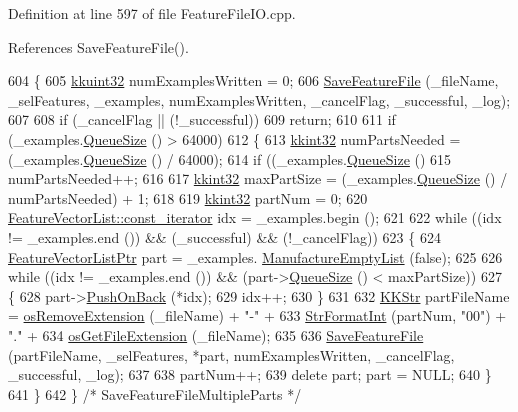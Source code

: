 Definition at line 597 of file Feature\+File\+I\+O.\+cpp.



References Save\+Feature\+File().


\begin{DoxyCode}
604 \{
605   \hyperlink{namespace_k_k_b_af8d832f05c54994a1cce25bd5743e19a}{kkuint32}  numExamplesWritten = 0;
606   \hyperlink{class_k_k_m_l_l_1_1_feature_file_i_o_ab4ad6c5a641f1f8f7c72c1be98bc1da8}{SaveFeatureFile} (\_fileName, \_selFeatures, \_examples, numExamplesWritten, \_cancelFlag, 
      \_successful, \_log);
607 
608   \textcolor{keywordflow}{if}  (\_cancelFlag  ||  (!\_successful))
609     \textcolor{keywordflow}{return};
610 
611   \textcolor{keywordflow}{if}  (\_examples.\hyperlink{class_k_k_b_1_1_k_k_queue_a1dab601f75ee6a65d97f02bddf71c40d}{QueueSize} () > 64000)
612   \{
613     \hyperlink{namespace_k_k_b_a8fa4952cc84fda1de4bec1fbdd8d5b1b}{kkint32}  numPartsNeeded = (\_examples.\hyperlink{class_k_k_b_1_1_k_k_queue_a1dab601f75ee6a65d97f02bddf71c40d}{QueueSize} () / 64000);
614     \textcolor{keywordflow}{if}  ((\_examples.\hyperlink{class_k_k_b_1_1_k_k_queue_a1dab601f75ee6a65d97f02bddf71c40d}{QueueSize} () %
615       numPartsNeeded++;
616 
617     \hyperlink{namespace_k_k_b_a8fa4952cc84fda1de4bec1fbdd8d5b1b}{kkint32}  maxPartSize = (\_examples.\hyperlink{class_k_k_b_1_1_k_k_queue_a1dab601f75ee6a65d97f02bddf71c40d}{QueueSize} () / numPartsNeeded) + 1;
618 
619     \hyperlink{namespace_k_k_b_a8fa4952cc84fda1de4bec1fbdd8d5b1b}{kkint32}  partNum = 0;
620     \hyperlink{class_k_k_b_1_1_k_k_queue_aeb057c9c010446f46f57c1e355f981f1}{FeatureVectorList::const\_iterator} idx = \_examples.begin ();
621 
622     \textcolor{keywordflow}{while}  ((idx != \_examples.end ())  &&  (\_successful)  &&  (!\_cancelFlag))
623     \{
624       \hyperlink{class_k_k_m_l_l_1_1_feature_vector_list}{FeatureVectorListPtr}  part = \_examples.
      \hyperlink{class_k_k_m_l_l_1_1_feature_vector_list_af533da1b34e4123f4fcb1343d5f48e37}{ManufactureEmptyList} (\textcolor{keyword}{false});
625 
626       \textcolor{keywordflow}{while}  ((idx != \_examples.end ())  &&  (part->\hyperlink{class_k_k_b_1_1_k_k_queue_a1dab601f75ee6a65d97f02bddf71c40d}{QueueSize} () < maxPartSize))
627       \{
628         part->\hyperlink{class_k_k_m_l_l_1_1_feature_vector_list_abd43779a90a6aa3db1de8092be877bdb}{PushOnBack} (*idx);
629         idx++;
630       \}
631 
632       \hyperlink{class_k_k_b_1_1_k_k_str}{KKStr}  partFileName = \hyperlink{namespace_k_k_b_a13b1a6f4e074969602dbe4bf9022a9c6}{osRemoveExtension} (\_fileName) + \textcolor{stringliteral}{"-"} + 
633                             \hyperlink{namespace_k_k_b_ae3bde258fa036604fac8bdb0277ab46e}{StrFormatInt} (partNum, \textcolor{stringliteral}{"00"}) + \textcolor{stringliteral}{"."} +
634                             \hyperlink{namespace_k_k_b_ac66b0fee156008ea19ba4a0068378743}{osGetFileExtension} (\_fileName);
635 
636       \hyperlink{class_k_k_m_l_l_1_1_feature_file_i_o_ab4ad6c5a641f1f8f7c72c1be98bc1da8}{SaveFeatureFile} (partFileName, \_selFeatures, *part, numExamplesWritten, \_cancelFlag, 
      \_successful, \_log);
637 
638       partNum++;
639       \textcolor{keyword}{delete}  part; part = NULL;
640     \}
641   \}
642 \}  \textcolor{comment}{/* SaveFeatureFileMultipleParts */}
\end{DoxyCode}
